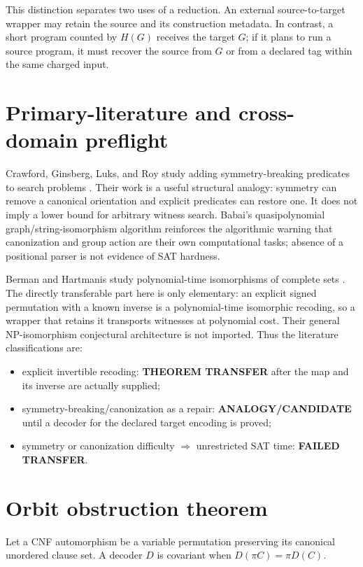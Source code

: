 \documentclass[11pt]{article}
\begin{document}
This distinction separates two uses of a reduction.  An external
source-to-target wrapper may retain the source and its construction metadata.
In contrast, a short program counted by $H(G)$ receives the target $G$; if it
plans to run a source program, it must recover the source from $G$ or from a
declared tag within the same charged input.

\section{Primary-literature and cross-domain preflight}
Crawford, Ginsberg, Luks, and Roy study adding symmetry-breaking predicates to
search problems \cite{CGLR}.  Their work is a useful structural analogy:
symmetry can remove a canonical orientation and explicit predicates can
restore one.  It does not imply a lower bound for arbitrary witness search.
Babai's quasipolynomial graph/string-isomorphism algorithm \cite{Babai}
reinforces the algorithmic warning that canonization and group action are
their own computational tasks; absence of a positional parser is not evidence
of SAT hardness.

Berman and Hartmanis study polynomial-time isomorphisms of complete sets
\cite{BH}.  The directly transferable part here is only elementary: an
explicit signed permutation with a known inverse is a polynomial-time
isomorphic recoding, so a wrapper that retains it transports witnesses at
polynomial cost.  Their general NP-isomorphism conjectural architecture is
not imported.  Thus the literature classifications are:
\begin{itemize}
\item explicit invertible recoding: \textbf{THEOREM TRANSFER} after the map
and its inverse are actually supplied;
\item symmetry-breaking/canonization as a repair: \textbf{ANALOGY/CANDIDATE}
until a decoder for the declared target encoding is proved;
\item symmetry or canonization difficulty $\Rightarrow$ unrestricted SAT
time: \textbf{FAILED TRANSFER}.
\end{itemize}

\section{Orbit obstruction theorem}
Let a CNF automorphism be a variable permutation preserving its canonical
unordered clause set.  A decoder $D$ is covariant when
$D(\pi C)=\pi D(C)$.
\end{document}
